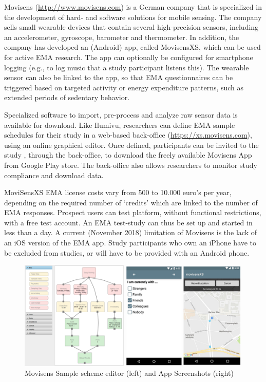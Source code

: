 \documentclass[]{book}
\begin{document}

Movisens (\url{http://www.movisens.com}) is a German company that is
specialized in the development of hard- and software solutions for
mobile sensing. The company sells small wearable devices that contain
several high-precision sensors, including an accelerometer, gyroscope,
barometer and thermometer. In addition, the company has developed an
(Android) app, called MovisensXS, which can be used for active EMA
research. The app can optionally be configured for smartphone logging
(e.g., to log music that a study participant listens this). The wearable
sensor can also be linked to the app, so that EMA questionnaires can be
triggered based on targeted activity or energy expenditure patterns,
such as extended periods of sedentary behavior.

Specialized software to import, pre-process and analyze raw sensor data
is available for download. Like Ilumivu, researchers can define EMA
sample schedules for their study in a web-based back-office
(\url{https://xs.movisens.com}), using an online graphical editor. Once
defined, participants can be invited to the study , through the
back-office, to download the freely available Movisens App from Google
Play store. The back-office also allows researchers to monitor study
compliance and download data.

MoviSensXS EMA license costs vary from 500 to 10.000 euro's per year,
depending on the required number of `credits' which are linked to the
number of EMA responses. Prospect users can test platform, without
functional restrictions, with a free test account. An EMA test-study can
thus be set up and started in less than a day. A current (November 2018)
limitation of Movisens is the lack of an iOS version of the EMA app.
Study participants who own an iPhone have to be excluded from studies,
or will have to be provided with an Android phone.

\begin{figure}[!t]

{\centering \includegraphics[width=0.8\linewidth]{images/instruments/movisens/movisens} 

}

\caption{Movisens Sample scheme editor (left) and App Screenshots (right)}\label{fig:movisens}
\end{figure}
\end{document}
